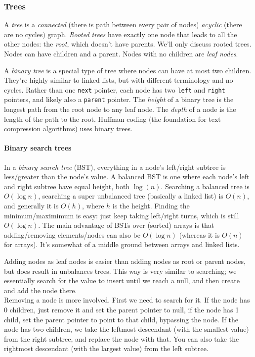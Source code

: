 \documentclass[8pt, table, xcdraw]{article}%
\begin{document}
\subsubsection{Trees}

A \emph{tree} is a \emph{connected} (there is path between every pair of nodes) \emph{acyclic} (there are no cycles) graph. \emph{Rooted trees} have exactly one node that leads to all the other nodes: the \emph{root}, which doesn't have parents. We'll only discuss rooted trees. Nodes can have children and a parent. Nodes with no children are \emph{leaf nodes}.

A \emph{binary tree} is a special type of tree where nodes can have at most two children. They're highly similar to linked lists, but with different terminology and no cycles. Rather than one \lstinline{next} pointer, each node has two \lstinline{left} and \lstinline{right} pointers, and likely also a \lstinline{parent} pointer. The \emph{height} of a binary tree is the longest path from the root node to any leaf node. The \emph{depth} of a node is the length of the path to the root. Huffman coding (the foundation for text compression algorithms) uses binary trees.

\paragraph{Binary search trees}

In a \emph{binary search tree} (BST), everything in a node's left/right subtree is less/greater than the node's value. A balanced BST is one where each node's left and right subtree have equal height, both $\log(n)$. Searching a balanced tree is $O(\log n)$, searching a super unbalanced tree (basically a linked list) is $O(n)$, and generally it is $O(h)$, where $h$ is the height. Finding the minimum/maximimum is easy: just keep taking left/right turns, which is still $O(\log n)$. The main advantage of BSTs over (sorted) arrays is that adding/removing elements/nodes can also be $O(\log n)$ (whereas it is $O(n)$ for arrays). It's somewhat of a middle ground between arrays and linked lists.

Adding nodes as leaf nodes is easier than adding nodes as root or parent nodes, but does result in unbalances trees. This way is very similar to searching; we essentially search for the value to insert until we reach a null, and then create and add the node there.\\
Removing a node is more involved. First we need to search for it. If the node has 0 children, just remove it and set the parent pointer to null, if the node has 1 child, set the parent pointer to point to that child, bypassing the node. If the node has two children, we take the leftmost descendant (with the smallest value) from the right subtree, and replace the node with that. You can also take the rightmost descendant (with the largest value) from the left subtree.
\end{document}
